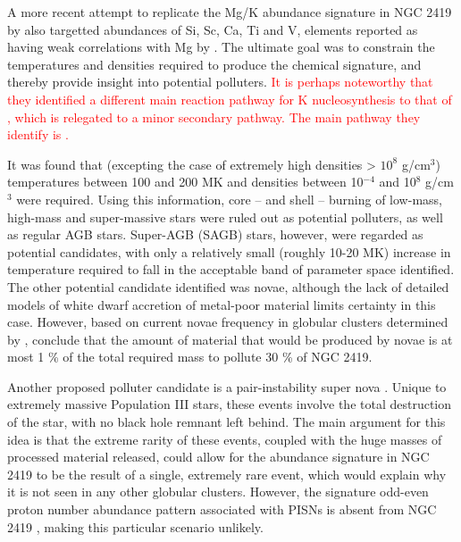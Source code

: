 \documentclass[a4paper,fleqn,usenatbib]{mnras}
\newcommand{\todo}[1]{\textcolor{red}{#1}}
\begin{document}
A more recent attempt to replicate the Mg/K abundance signature in NGC 2419 by \cite{iliadis2016} also targetted abundances of Si, Sc, Ca, Ti and V, elements reported as having weak correlations with Mg by \cite{cohenkirby2012}. The ultimate goal was to constrain the temperatures and densities required to produce the chemical signature, and thereby provide insight into potential polluters. \todo{ It is perhaps noteworthy that they identified a different main reaction pathway for K nucleosynthesis to that of \cite{ventura2012}, which is relegated to a minor secondary pathway. The main pathway they identify is \ce{^{36}Ar(p,\gamma)^{37}K(\beta ^+ \nu)^{37}Ar(p,\gamma)^{38}K(\beta ^+ \nu)^{38}Ar(p,\gamma)^39K}.}

It was found that (excepting the case of extremely high densities > $10^8$ g/cm$^3$) temperatures between 100 and 200 MK and densities between 10$^{-4}$ and 10$^8$ g/cm$^3$ were required. Using this information, core -- and shell --  burning of low-mass, high-mass and super-massive stars were ruled out as potential polluters, as well as regular AGB stars. Super-AGB (SAGB) stars, however, were regarded as potential candidates, with only a relatively small (roughly 10-20 MK) increase in temperature required to fall in the acceptable band of parameter space identified. The other potential candidate identified was novae, although the lack of detailed models of white dwarf accretion of metal-poor material limits certainty in this case. However, based on current novae frequency in globular clusters determined by \cite{kato2013novae}, \cite{iliadis2016} conclude that the amount of material that would be produced by novae is at most 1 \% of the total required mass to pollute 30 \% of NGC 2419.

Another proposed  polluter candidate is a pair-instability super nova \citep[PISN;][]{carretta2013}. Unique to extremely massive Population III stars, these events involve the total destruction of the star, with no black hole remnant left behind. The main argument for this idea is that the extreme rarity of these events, coupled with the huge masses of processed material released, could allow for the abundance signature in NGC 2419 to be the result of a single, extremely rare event, which would explain why it is not seen in any other globular clusters. However, the signature odd-even proton number abundance pattern associated with PISNs is absent from NGC 2419 \citep{cohenkirby2012}, making this particular scenario unlikely.

\end{document}
